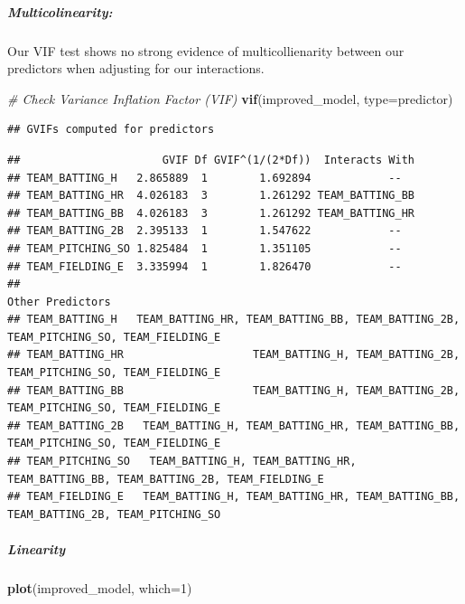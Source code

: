 \documentclass[
]{article}
\newenvironment{Shaded}{\begin{snugshade}}{\end{snugshade}}
\newcommand{\AttributeTok}[1]{\textcolor[rgb]{0.13,0.29,0.53}{#1}}
\newcommand{\CommentTok}[1]{\textcolor[rgb]{0.56,0.35,0.01}{\textit{#1}}}
\newcommand{\DecValTok}[1]{\textcolor[rgb]{0.00,0.00,0.81}{#1}}
\newcommand{\FunctionTok}[1]{\textcolor[rgb]{0.13,0.29,0.53}{\textbf{#1}}}
\newcommand{\NormalTok}[1]{#1}
\newcommand{\StringTok}[1]{\textcolor[rgb]{0.31,0.60,0.02}{#1}}
\begin{document}
\subparagraph{Multicolinearity:}\label{multicolinearity}

Our VIF test shows no strong evidence of multicollienarity between our
predictors when adjusting for our interactions.

\begin{Shaded}
\begin{Highlighting}[]
\CommentTok{\# Check Variance Inflation Factor (VIF)}
\FunctionTok{vif}\NormalTok{(improved\_model, }\AttributeTok{type=}\StringTok{\textquotesingle{}predictor\textquotesingle{}}\NormalTok{)}
\end{Highlighting}
\end{Shaded}

\begin{verbatim}
## GVIFs computed for predictors
\end{verbatim}

\begin{verbatim}
##                      GVIF Df GVIF^(1/(2*Df))  Interacts With
## TEAM_BATTING_H   2.865889  1        1.692894            --  
## TEAM_BATTING_HR  4.026183  3        1.261292 TEAM_BATTING_BB
## TEAM_BATTING_BB  4.026183  3        1.261292 TEAM_BATTING_HR
## TEAM_BATTING_2B  2.395133  1        1.547622            --  
## TEAM_PITCHING_SO 1.825484  1        1.351105            --  
## TEAM_FIELDING_E  3.335994  1        1.826470            --  
##                                                                                      Other Predictors
## TEAM_BATTING_H   TEAM_BATTING_HR, TEAM_BATTING_BB, TEAM_BATTING_2B, TEAM_PITCHING_SO, TEAM_FIELDING_E
## TEAM_BATTING_HR                    TEAM_BATTING_H, TEAM_BATTING_2B, TEAM_PITCHING_SO, TEAM_FIELDING_E
## TEAM_BATTING_BB                    TEAM_BATTING_H, TEAM_BATTING_2B, TEAM_PITCHING_SO, TEAM_FIELDING_E
## TEAM_BATTING_2B   TEAM_BATTING_H, TEAM_BATTING_HR, TEAM_BATTING_BB, TEAM_PITCHING_SO, TEAM_FIELDING_E
## TEAM_PITCHING_SO   TEAM_BATTING_H, TEAM_BATTING_HR, TEAM_BATTING_BB, TEAM_BATTING_2B, TEAM_FIELDING_E
## TEAM_FIELDING_E   TEAM_BATTING_H, TEAM_BATTING_HR, TEAM_BATTING_BB, TEAM_BATTING_2B, TEAM_PITCHING_SO
\end{verbatim}

\subparagraph{Linearity}\label{linearity-2}

\begin{Shaded}
\begin{Highlighting}[]
\FunctionTok{plot}\NormalTok{(improved\_model, }\AttributeTok{which=}\DecValTok{1}\NormalTok{)}
\end{Highlighting}
\end{Shaded}
\end{document}
